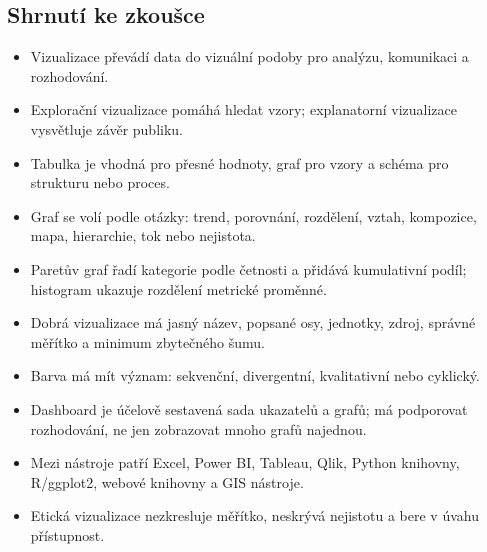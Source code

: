 \subsection{Shrnutí ke zkoušce}
\begin{itemize}
  \item Vizualizace převádí data do vizuální podoby pro analýzu, komunikaci a rozhodování.
  \item Explorační vizualizace pomáhá hledat vzory; explanatorní vizualizace vysvětluje závěr publiku.
  \item Tabulka je vhodná pro přesné hodnoty, graf pro vzory a schéma pro strukturu nebo proces.
  \item Graf se volí podle otázky: trend, porovnání, rozdělení, vztah, kompozice, mapa, hierarchie,
  tok nebo nejistota.
  \item Paretův graf řadí kategorie podle četnosti a přidává kumulativní podíl; histogram ukazuje
  rozdělení metrické proměnné.
  \item Dobrá vizualizace má jasný název, popsané osy, jednotky, zdroj, správné měřítko a minimum
  zbytečného šumu.
  \item Barva má mít význam: sekvenční, divergentní, kvalitativní nebo cyklický.
  \item Dashboard je účelově sestavená sada ukazatelů a grafů; má podporovat rozhodování, ne jen
  zobrazovat mnoho grafů najednou.
  \item Mezi nástroje patří Excel, Power BI, Tableau, Qlik, Python knihovny, R/ggplot2, webové
  knihovny a GIS nástroje.
  \item Etická vizualizace nezkresluje měřítko, neskrývá nejistotu a bere v úvahu přístupnost.
\end{itemize}

